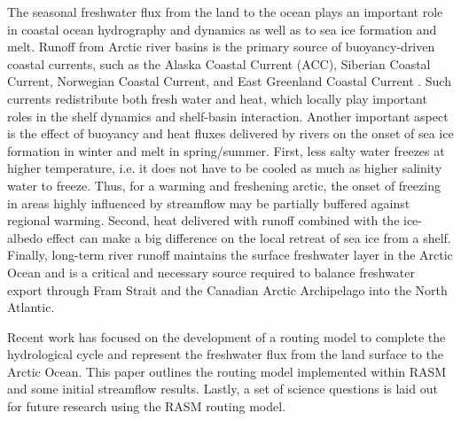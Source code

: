 The seasonal freshwater flux from the land to the ocean plays an important role in coastal ocean hydrography and dynamics as well as to sea ice formation and melt.
Runoff from Arctic river basins is the primary source of buoyancy-driven coastal currents, such as the Alaska Coastal Current (ACC), Siberian Coastal Current, Norwegian Coastal Current, and East Greenland Coastal Current \citep[e.g.]{Serreze_2000,Boyd_2002, McGeehan_2012}.
Such currents redistribute both fresh water and heat, which locally play important roles in the shelf dynamics and shelf-basin interaction. Another important aspect is the effect of buoyancy and heat fluxes delivered by rivers on the onset of sea ice formation in winter and melt in spring/summer.
First, less salty water freezes at higher temperature, i.e. it does not have to be cooled as much as higher salinity water to freeze.
Thus, for a warming and freshening arctic, the onset of freezing in areas highly influenced by streamflow may be partially buffered against regional warming.
Second, heat delivered with runoff combined with the ice-albedo effect can make a big difference on the local retreat of sea ice from a shelf.
Finally, long-term river runoff maintains the surface freshwater layer in the Arctic Ocean and is a critical and necessary source required to balance freshwater export through Fram Strait and the Canadian Arctic Archipelago into the North Atlantic.

Recent work has focused on the development of a routing model to complete the hydrological cycle and represent the freshwater flux from the land surface to the Arctic Ocean.
This paper outlines the routing model implemented within RASM and some initial streamflow results.
Lastly, a set of science questions is laid out for future research using the RASM routing model.

  
  
  